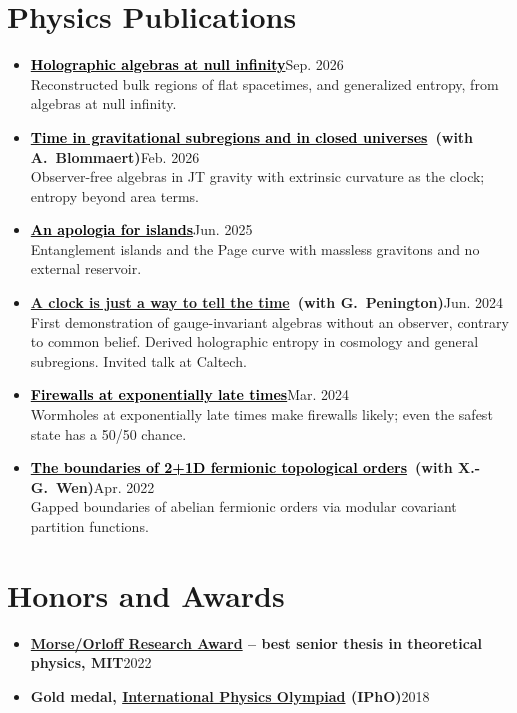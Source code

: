 \documentclass[11pt]{article}
\newcommand{\entry}[2]{\textbf{#1}\hfill{\small #2}}
\begin{document}
\section{Physics Publications}
\begin{itemize}
  \item \entry{\href{https://arxiv.org/abs/2609.01706}{\textcolor{black}{Holographic algebras at null infinity}}}{Sep. 2026}\\
        Reconstructed bulk regions of flat spacetimes, and generalized entropy, from algebras at null infinity.
  \item \entry{\href{https://arxiv.org/abs/2602.22153}{\textcolor{black}{Time in gravitational subregions and in closed universes}}\ \normalfont(with A.\ Blommaert)}{Feb. 2026}\\
        Observer-free algebras in JT gravity with extrinsic curvature as the clock; entropy beyond area terms.
  \item \entry{\href{https://arxiv.org/abs/2506.04311}{\textcolor{black}{An apologia for islands}}}{Jun. 2025}\\
        Entanglement islands and the Page curve with massless gravitons and no external reservoir.
  \item \entry{\href{https://arxiv.org/abs/2406.02116}{\textcolor{hl}{A clock is just a way to tell the time}}\ \normalfont(with G.\ Penington)}{Jun. 2024}\\
        First demonstration of gauge-invariant algebras without an observer, contrary to common belief.
        Derived holographic entropy in cosmology and general subregions. Invited talk at Caltech.
  \item \entry{\href{https://arxiv.org/abs/2403.07049}{\textcolor{black}{Firewalls at exponentially late times}}}{Mar. 2024}\\
        Wormholes at exponentially late times make firewalls likely; even the safest state has a 50/50 chance.
  \item \entry{\href{https://arxiv.org/abs/2204.06589}{\textcolor{black}{The boundaries of 2+1D fermionic topological orders}}\ \normalfont(with X.-G.\ Wen)}{Apr. 2022}\\
        Gapped boundaries of abelian fermionic orders via modular covariant partition functions.
\end{itemize}

\section{Honors and Awards}
\begin{itemize}
  \item \entry{\href{https://physics.mit.edu/academic-programs/student-awards/}{Morse/Orloff Research Award} -- best senior thesis in theoretical physics, MIT}{2022}
  \item \entry{Gold medal, \href{https://ipho2018.pt/content/exams}{International Physics Olympiad} (IPhO)}{2018}
\end{itemize}
\end{document}
